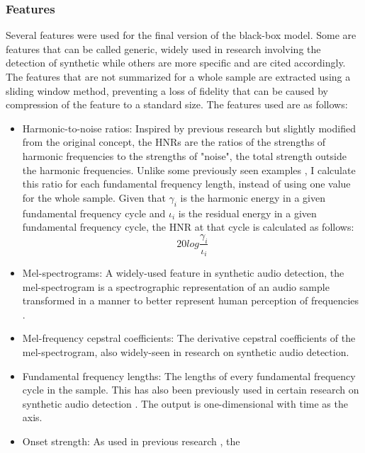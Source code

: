 \documentclass{article}
\begin{document}
			\subsubsection{Features}
			Several features were used for the final version of the black-box model. Some are
			features that can be called generic, widely used in research involving the detection
			of synthetic while others are more specific and are cited accordingly. The features
			that are not summarized for a whole sample are extracted using a sliding window method,
			preventing a loss of fidelity that can be caused by compression of the feature to a
			standard size. The features used are as follows:
			\begin{itemize}
				\item
					\sloppy
					Harmonic-to-noise ratios: Inspired by previous research
					\cite{chaiwongyen_contribution_2022,chaiwongyen_deepfake-speech_2023,
					li_comparative_2022} but slightly modified from the original concept, the HNRs
					are the ratios of the strengths of harmonic frequencies to the strengths of
					"noise", the total strength outside the harmonic frequencies. Unlike some
					previously seen examples \cite{chaiwongyen_contribution_2022,
					chaiwongyen_deepfake-speech_2023}, I calculate this ratio for each fundamental
					frequency length, instead of using one value for the whole sample. Given that
					 \(\gamma_{i}\) is the harmonic energy in a given fundamental frequency cycle
					 and \(\iota_{i}\) is the residual energy in a given fundamental frequency
					 cycle, the HNR at that cycle is calculated as follows:
					 \[ 20log\frac{\gamma_{i}}{\iota_{i}} \]
				\item
					Mel-spectrograms: A widely-used feature in synthetic audio detection, the
					mel-spectrogram is a spectrographic representation of an audio sample
					transformed in a manner to better represent human perception of frequencies
					\cite{qais_deepfake_2022}.
				\item
					Mel-frequency cepstral coefficients: The derivative cepstral coefficients of
					the mel-spectrogram, also widely-seen in research on synthetic audio detection.
				\item
					Fundamental frequency lengths: The lengths of every fundamental frequency
					cycle in the sample. This has also been previously used in certain research on
					synthetic audio detection \cite{xue_audio_2022}. The output is one-dimensional
					with time as the axis.
				\item
					Onset strength: As used in previous research \cite{li_comparative_2022}, the

\end{itemize}
\end{document}
